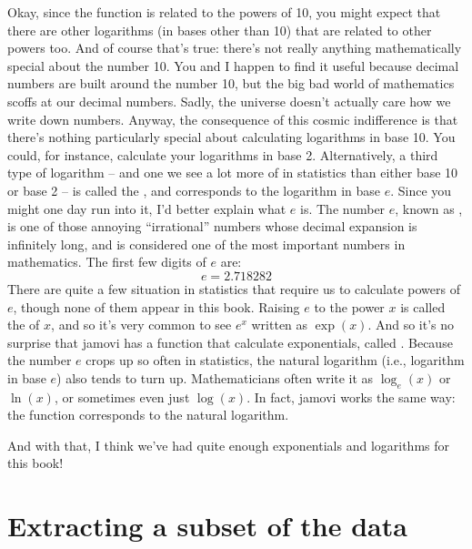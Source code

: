 Okay, since the  function is related to the powers of 10, you might expect that there are other logarithms (in bases other than 10) that are related to other powers too. And of course that's true: there's not really anything mathematically special about the number 10. You and I happen to find it useful because decimal numbers are built around the number 10, but the big bad world of mathematics scoffs at our decimal numbers. Sadly, the universe doesn't actually care how we write down numbers. Anyway, the consequence of this cosmic indifference is that there's nothing particularly special about calculating logarithms in base 10. You could, for instance, calculate your logarithms in base 2. Alternatively, a third type of logarithm -- and one we see a lot more of in statistics than either base 10 or base 2 -- is called the , and corresponds to the logarithm in base $e$. Since you might one day run into it, I'd better explain what $e$ is. The number $e$, known as , is one of those annoying ``irrational'' numbers whose decimal expansion is infinitely long, and is considered one of the most important numbers in mathematics. The first few digits of $e$ are:
$$
e = 2.718282 
$$ 
There are quite a few situation in statistics that require us to calculate powers of $e$, though none of them appear in this book. Raising $e$ to the power $x$ is called the  of $x$, and so it's very common to see $e^x$ written as $\exp(x)$. And so it's no surprise that jamovi has a function that calculate exponentials, called . Because the number $e$ crops up so often in statistics, the natural logarithm (i.e., logarithm in base $e$) also tends to turn up. Mathematicians often write it as $\log_e(x)$ or $\ln(x)$, or sometimes even just $\log(x)$. In fact, jamovi works the same way: the  function corresponds to the natural logarithm.

And with that, I think we've had quite enough exponentials and logarithms for this book!







\section{Extracting a subset of the data~\label{sec:subset}}

